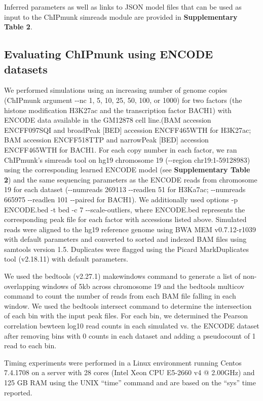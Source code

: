 \documentclass[12pt]{article}
\begin{document}
Inferred parameters as well as links to JSON model files that can be used as input to the ChIPmunk simreads module are provided in \textbf{Supplementary Table 2}.

\subsection*{Evaluating ChIPmunk using ENCODE datasets}

We performed simulations using an increasing number of genome copies (ChIPmunk argument -{}-nc 1, 5, 10, 25, 50, 100, or 1000) for two factors (the histone modification H3K27ac and the transcription factor BACH1) with ENCODE data available in the GM12878 cell line.(BAM accession ENCFF097SQI and broadPeak [BED] accession ENCFF465WTH for H3K27ac; BAM accession ENCFF518TTP and narrowPeak [BED] accession ENCFF465WTH for BACH1.
For each copy number in each factor, we ran ChIPmunk's simreads tool on hg19 chromosome 19 (-{}-region chr19:1-59128983) using the corresponding learned ENCODE model (see \textbf{Supplementary Table 2}) and the same sequencing parameters as the ENCODE reads from chromosome 19 for each dataset (-{}-numreads 269113 -{}-readlen 51 for H3Ka7ac; -{}-numreads 665975 -{}-readlen 101 -{}-paired for BACH1). 
We additionally used options -p ENCODE.bed -t bed -c 7 -{}-scale-outliers, where ENCODE.bed represents the corresponding peak file for each factor with accessions listed above.
Simulated reads were aligned to the hg19 reference genome using BWA MEM \cite{bwamem} v0.7.12-r1039 with default parameters and converted to sorted and indexed BAM files using samtools \cite{samtools} version 1.5. Duplicates were flagged using the Picard \cite{picard} MarkDuplicates tool (v2.18.11) with default parameters.

We used the bedtools \cite{bedtools} (v2.27.1) makewindows command to generate a list of non-overlapping windows of 5kb across chromosome 19 and the bedtools multicov command to count the number of reads from each BAM file falling in each window. We used the bedtools intersect command to determine the intersection of each bin with the input peak files. For each bin, we determined the Pearson correlation bewteen log10 read counts in each simulated vs. the ENCODE dataset after removing bins with 0 counts in each dataset and adding a pseudocount of 1 read to each bin.

Timing experiments were performed in a Linux environment running Centos 7.4.1708 on a server with 28 cores (Intel\textsuperscript{\textregistered} Xeon\textsuperscript{\textregistered} CPU E5-2660 v4 @ 2.00GHz) and 125 GB RAM using the UNIX ``time'' command and are based on the ``sys'' time reported. %
\end{document}
